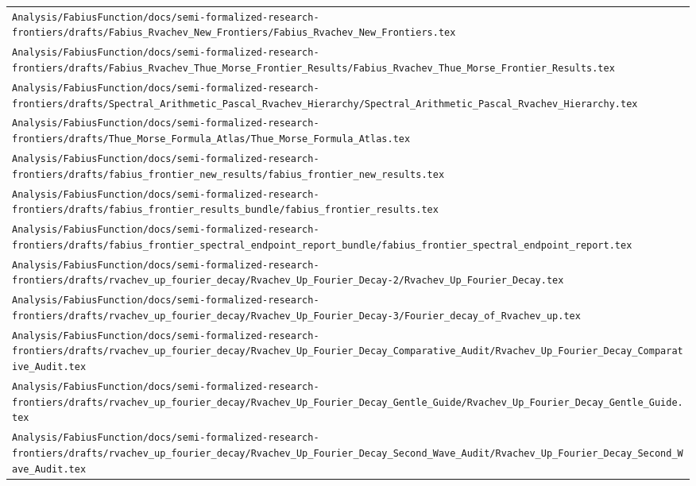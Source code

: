 \begin{longtable}{@{}p{\textwidth}@{}}
\nolinkurl{Analysis/FabiusFunction/docs/semi-formalized-research-frontiers/drafts/Fabius_Rvachev_New_Frontiers/Fabius_Rvachev_New_Frontiers.tex}\\[0.12em]
\nolinkurl{Analysis/FabiusFunction/docs/semi-formalized-research-frontiers/drafts/Fabius_Rvachev_Thue_Morse_Frontier_Results/Fabius_Rvachev_Thue_Morse_Frontier_Results.tex}\\[0.12em]
\nolinkurl{Analysis/FabiusFunction/docs/semi-formalized-research-frontiers/drafts/Spectral_Arithmetic_Pascal_Rvachev_Hierarchy/Spectral_Arithmetic_Pascal_Rvachev_Hierarchy.tex}\\[0.12em]
\nolinkurl{Analysis/FabiusFunction/docs/semi-formalized-research-frontiers/drafts/Thue_Morse_Formula_Atlas/Thue_Morse_Formula_Atlas.tex}\\[0.12em]
\nolinkurl{Analysis/FabiusFunction/docs/semi-formalized-research-frontiers/drafts/fabius_frontier_new_results/fabius_frontier_new_results.tex}\\[0.12em]
\nolinkurl{Analysis/FabiusFunction/docs/semi-formalized-research-frontiers/drafts/fabius_frontier_results_bundle/fabius_frontier_results.tex}\\[0.12em]
\nolinkurl{Analysis/FabiusFunction/docs/semi-formalized-research-frontiers/drafts/fabius_frontier_spectral_endpoint_report_bundle/fabius_frontier_spectral_endpoint_report.tex}\\[0.12em]
\nolinkurl{Analysis/FabiusFunction/docs/semi-formalized-research-frontiers/drafts/rvachev_up_fourier_decay/Rvachev_Up_Fourier_Decay-2/Rvachev_Up_Fourier_Decay.tex}\\[0.12em]
\nolinkurl{Analysis/FabiusFunction/docs/semi-formalized-research-frontiers/drafts/rvachev_up_fourier_decay/Rvachev_Up_Fourier_Decay-3/Fourier_decay_of_Rvachev_up.tex}\\[0.12em]
\nolinkurl{Analysis/FabiusFunction/docs/semi-formalized-research-frontiers/drafts/rvachev_up_fourier_decay/Rvachev_Up_Fourier_Decay_Comparative_Audit/Rvachev_Up_Fourier_Decay_Comparative_Audit.tex}\\[0.12em]
\nolinkurl{Analysis/FabiusFunction/docs/semi-formalized-research-frontiers/drafts/rvachev_up_fourier_decay/Rvachev_Up_Fourier_Decay_Gentle_Guide/Rvachev_Up_Fourier_Decay_Gentle_Guide.tex}\\[0.12em]
\nolinkurl{Analysis/FabiusFunction/docs/semi-formalized-research-frontiers/drafts/rvachev_up_fourier_decay/Rvachev_Up_Fourier_Decay_Second_Wave_Audit/Rvachev_Up_Fourier_Decay_Second_Wave_Audit.tex}\\[0.12em]

\end{longtable}
